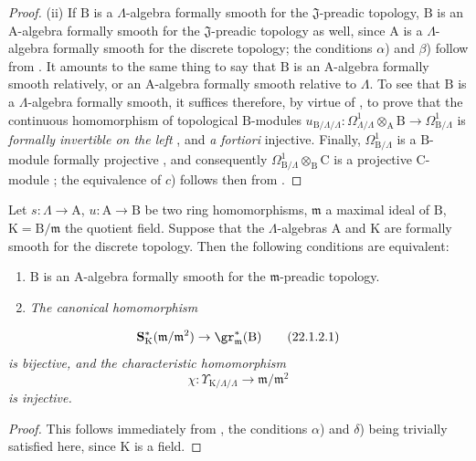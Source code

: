 \begin{proof}
(ii) If $\mathrm{B}$ is a $\Lambda$-algebra formally smooth for the $\mathfrak{J}$-preadic topology, $\mathrm{B}$ is an $\mathrm{A}$-algebra formally smooth for the $\mathfrak{J}$-preadic topology as well, since $\mathrm{A}$ is a $\Lambda$-algebra formally smooth for the discrete topology; the conditions $\alpha$) and $\beta$) follow from .
It amounts to the same thing to say that $\mathrm{B}$ is an $\mathrm{A}$-algebra formally smooth relatively, or an $\mathrm{A}$-algebra formally smooth relative to $\Lambda$.
To see that $\mathrm{B}$ is a $\Lambda$-algebra formally smooth, it suffices therefore, by virtue of , to prove that the continuous homomorphism of topological $\mathrm{B}$-modules $u_{\mathrm{B}/\Lambda/\Lambda}:\Omega^1_{\Lambda/\Lambda}\otimes_\mathrm{A}\mathrm{B}\to\Omega^1_{\mathrm{B}/\Lambda}$ is \emph{formally invertible on the left} , and \emph{a fortiori} injective.
Finally, $\Omega^1_{\mathrm{B}/\Lambda}$ is a $\mathrm{B}$-module formally projective , and consequently $\Omega^1_{\mathrm{B}/\Lambda}\otimes_\mathrm{B}\mathrm{C}$ is a projective $\mathrm{C}$-module ; the equivalence of $c$) follows then from .
\end{proof}

\begin{corollary}[22.1.2]
\label{0.22.1.2}
Let $s:\Lambda\to\mathrm{A}$, $u:\mathrm{A}\to\mathrm{B}$ be two ring homomorphisms, $\mathfrak{m}$ a maximal ideal of $\mathrm{B}$, $\mathrm{K}=\mathrm{B}/\mathfrak{m}$ the quotient field.
Suppose that the $\Lambda$-algebras $\mathrm{A}$ and $\mathrm{K}$ are formally smooth for the discrete topology.
Then the following conditions are equivalent:
\begin{enumerate}
  \item[a)] $\mathrm{B}$ is an $\mathrm{A}$-algebra formally smooth for the $\mathfrak{m}$-preadic topology.
  \item[b)] \emph{The canonical homomorphism}
\end{enumerate}
\[
\label{0.22.1.2.1}
  \mathbf{S}^*_\mathrm{K}(\mathfrak{m}/\mathfrak{m}^2)\to\gr^*_\mathfrak{m}(\mathrm{B})
  \tag{22.1.2.1}
\]
\emph{is bijective, and the characteristic homomorphism}
\[
\label{0.22.1.2.2}
  \chi:\Upsilon_{\mathrm{K}/\Lambda/\Lambda}\to\mathfrak{m}/\mathfrak{m}^2
  \tag{22.1.2.2}
\]
\emph{is injective.}
\end{corollary}

\begin{proof}
This follows immediately from , the conditions $\alpha$) and $\delta$) being trivially satisfied here, since $\mathrm{K}$ is a field.
\end{proof}

